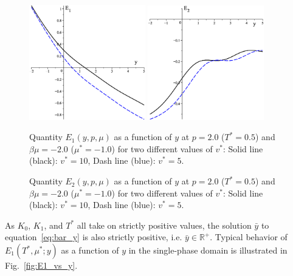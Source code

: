 \documentclass[12pt]{article}
\numberwithin{equation}{section}
\begin{document}
	\begin{figure}[htbp]
		\includegraphics[width=0.45\textwidth,angle=0]{E1_vs_y2}
		\hfill
		\includegraphics[width=0.45\textwidth,angle=0]{E2_vs_y}
		\\
		\parbox{0.45\textwidth}{\caption{\label{fig:E1_vs_y} Quantity $E_1(y,p,\mu)$ as a function of $y$ at $p=2.0$ ($T^*=0.5$) and $\beta\mu=-2.0$ ($\mu^*=-1.0$) for two different values of $v^*$: Solid line (black): $v^* = 10$, Dash line (blue): $v^* = 5$.}}
		\hfill
		\parbox{0.45\textwidth}{\caption{\label{fig:E2_vs_y} Quantity $E_2(y,p,\mu)$ as a function of $y$ at $p=2.0$ ($T^*=0.5$) and $\beta\mu=-2.0$ ($\mu^*=-1.0$) for two different values of $v^*$: Solid line (black): $v^* = 10$, Dash line (blue): $v^* = 5$.}}
	\end{figure}
	
	As $K_0$, $K_1$, and $T^*$ all take on strictly positive values, the solution $\bar{y}$ to equation~\eqref{eq:bar_y} is also strictly positive, i.e. $\bar{y} \in \mathbb{R}^{+}$.
	Typical behavior of $E_1(T^*,\mu^*;y)$ as a function of $y$ in the single-phase domain is illustrated in Fig.~\ref{fig:E1_vs_y}.
	
\end{document}
